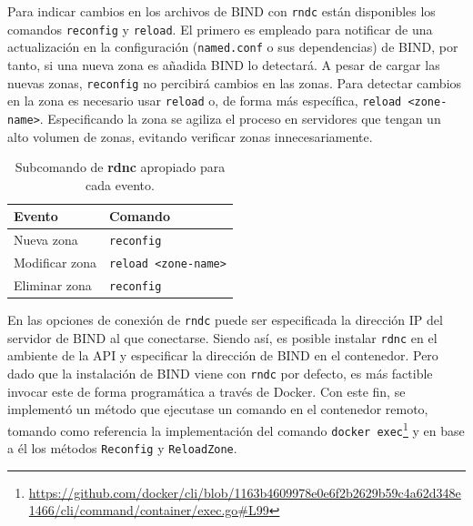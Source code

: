Para indicar cambios en los archivos de BIND con \verb|rndc| están disponibles los comandos \verb|reconfig| y \verb|reload|. El primero es empleado para notificar de una actualización en la configuración (\verb|named.conf| o sus dependencias) de BIND, por tanto, si una nueva zona es añadida BIND lo detectará. A pesar de cargar las nuevas zonas, \verb|reconfig| no percibirá cambios en las zonas. Para detectar cambios en la zona es necesario usar \verb|reload| o, de forma más específica, \verb|reload <zone-name>|. Especificando la zona se agiliza el proceso en servidores que tengan un alto volumen de zonas, evitando verificar zonas innecesariamente.

\begin{table}[!ht]
    \centering
    \begin{tabular}{|l|l|}
    \hline
        \textbf{Evento} & \textbf{Comando} \\ \hline
        Nueva zona & \verb|reconfig| \\ \hline
        Modificar zona & \verb|reload <zone-name>| \\ \hline
        Eliminar zona & \verb|reconfig| \\ \hline
    \end{tabular}
    \caption{Subcomando de \textbf{rdnc} apropiado para cada evento.}
    \label{table:rndc-event}
\end{table}

En las opciones de conexión de \verb|rndc| puede ser especificada la dirección IP del servidor de BIND al que conectarse. Siendo así, es posible instalar \verb|rdnc| en el ambiente de la API y especificar la dirección de BIND en el contenedor. Pero dado que la instalación de BIND viene con \verb|rndc| por defecto, es más factible invocar este de forma programática a través de Docker. Con este fin, se implementó un método que ejecutase un comando en el contenedor remoto, tomando como referencia la implementación del comando \verb|docker exec|\footnote{\url{https://github.com/docker/cli/blob/1163b4609978e0e6f2b2629b59c4a62d348e1466/cli/command/container/exec.go\#L99}} y en base a él los métodos \verb|Reconfig| y \verb|ReloadZone|.

